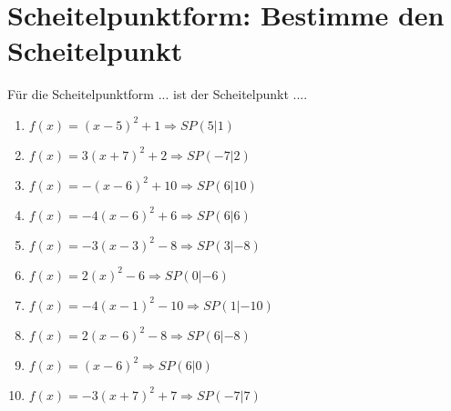 \documentclass{article}%
\begin{document}
\section{Scheitelpunktform: Bestimme den Scheitelpunkt}%
\label{sec:ScheitelpunktformBestimmedenScheitelpunkt}%
Für die Scheitelpunktform ... ist der Scheitelpunkt ....%
\begin{enumerate}[label=\alph*)]%
\item%
\newline\vspace{0.5cm}$f(x)=(x-5)^2 +1 \Rightarrow SP(5|1) $%
\item%
\newline\vspace{0.5cm}$f(x)=3(x+7)^2 +2 \Rightarrow SP(-7|2) $%
\item%
\newline\vspace{0.5cm}$f(x)=-(x-6)^2 +10 \Rightarrow SP(6|10) $%
\item%
\newline\vspace{0.5cm}$f(x)=-4(x-6)^2 +6 \Rightarrow SP(6|6) $%
\item%
\newline\vspace{0.5cm}$f(x)=-3(x-3)^2 -8 \Rightarrow SP(3|-8) $%
\item%
\newline\vspace{0.5cm}$f(x)=2(x)^2 -6 \Rightarrow SP(0|-6) $%
\item%
\newline\vspace{0.5cm}$f(x)=-4(x-1)^2 -10 \Rightarrow SP(1|-10) $%
\item%
\newline\vspace{0.5cm}$f(x)=2(x-6)^2 -8 \Rightarrow SP(6|-8) $%
\item%
\newline\vspace{0.5cm}$f(x)=(x-6)^2 \Rightarrow SP(6|0) $%
\item%
\newline\vspace{0.5cm}$f(x)=-3(x+7)^2 +7 \Rightarrow SP(-7|7) $%
\end{enumerate}

%
\end{document}
